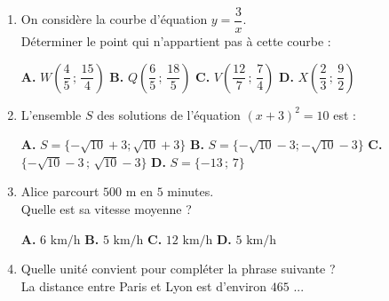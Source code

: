 \documentclass[a4paper,11pt]{article}
\begin{document}
\begin{seance}{}
\begin{enumerate}
\begin{multicols}{2}
\begin{tikzpicture}[baseline,scale = 0.5]
\end{tikzpicture}
    \end{multicols}
\medskip
\begin{center}
\textbf{\textcolor{Couleur1}{A.}} On ne peut pas déterminer la position de $A$ par rapport à la droite $(D)$ \qquad \textbf{\textcolor{Couleur1}{B.}} Le point $A$ appartient à la droite $(D)$ \qquad \textbf{\textcolor{Couleur1}{C.}} Le point $A$ est situé en dessous de la droite $(D)$ \qquad \textbf{\textcolor{Couleur1}{D.}} Le point $A$ est situé au-dessus de la droite $(D)$
\end{center}


\item On considère la courbe d'équation $y=\dfrac{3}{x}$. \\
    Déterminer le point qui n'appartient pas à cette courbe :

\medskip
\begin{center}
\textbf{\textcolor{Couleur1}{A.}} $W\left(\dfrac{4}{5}\,;\,\dfrac{15}{4}\right)$ \qquad \textbf{\textcolor{Couleur1}{B.}} $Q\left(\dfrac{6}{5}\,;\,\dfrac{18}{5}\right)$ \qquad \textbf{\textcolor{Couleur1}{C.}} $V\left(\dfrac{12}{7}\,;\,\dfrac{7}{4}\right)$ \qquad \textbf{\textcolor{Couleur1}{D.}} $X\left(\dfrac{2}{3}\,;\,\dfrac{9}{2}\right)$
\end{center}


\item L'ensemble $S$ des solutions de l'équation  $(x+3)^2=10$ est :

\medskip
\begin{center}
\textbf{\textcolor{Couleur1}{A.}} $S=\{-\sqrt{10}+3;\sqrt{10}+3\}$ \qquad \textbf{\textcolor{Couleur1}{B.}} $S=\{-\sqrt{10}-3;-\sqrt{10}-3\}$ \qquad \textbf{\textcolor{Couleur1}{C.}} $\{-\sqrt{10}-3\,;\,\sqrt{10}-3\}$ \qquad \textbf{\textcolor{Couleur1}{D.}} $S=\{-13\,;\,7\}$
\end{center}


\item Alice parcourt $500\text{ m}$ en $5$ minutes. \\Quelle est sa vitesse moyenne ?

\medskip
\begin{center}
\textbf{\textcolor{Couleur1}{A.}} $6\text{ km/h}$ \qquad \textbf{\textcolor{Couleur1}{B.}} $5\text{ km/h}$ \qquad \textbf{\textcolor{Couleur1}{C.}} $12\text{ km/h}$ \qquad \textbf{\textcolor{Couleur1}{D.}} $5\text{ km/h}$
\end{center}


\item Quelle unité convient pour compléter la phrase suivante ?\\La distance entre Paris et Lyon est d'environ $465$ ...


\end{enumerate}
\end{seance}
\end{document}
